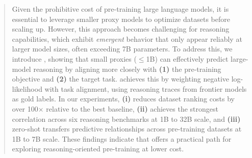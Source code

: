 \begin{abstract}
Given the prohibitive cost of pre-training large language models, it is essential to leverage smaller proxy models to optimize datasets before scaling up. However, this approach becomes challenging for reasoning capabilities, which exhibit \textit{emergent} behavior that only appear reliably at larger model sizes, often exceeding 7B parameters. To address this, we introduce , showing that small proxies ($\leq$1B) can effectively predict large-model reasoning by aligning more closely with \textbf{(1)} the pre-training objective and \textbf{(2)} the target task.  achieves this by weighting negative log-likelihood with task alignment, using reasoning traces from frontier models as gold labels. In our experiments,  \textbf{(i)} reduces dataset ranking costs by over 100$\times$ relative to the best baseline, \textbf{(ii)} achieves the strongest correlation across six reasoning benchmarks at 1B to 32B scale, and \textbf{(iii)} zero-shot transfers predictive relationships across pre-training datasets at 1B to 7B scale. These findings indicate that  offers a practical path for exploring reasoning-oriented pre-training at lower cost.
\begin{center}

\href{https://huggingface.co/datasets/trillionlabs/rbridge}{ \textbf{}}

\end{center}

\end{abstract}